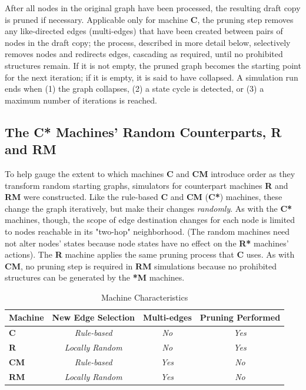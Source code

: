\documentclass{tufte-handout}
\begin{document}
\vspace{1mm}
After all nodes in the original graph have been processed,
the resulting draft copy is pruned if necessary.
Applicable only for machine \textbf{C}, the pruning step removes
any like-directed edges (multi-edges) that have been created between pairs
of nodes in the draft copy; the process, described in more detail below,
selectively removes nodes and redirects edges, cascading as required,
until no prohibited structures remain.
If it is not empty, the pruned graph becomes the starting point for the next iteration;
if it is empty, it is said to have collapsed.
A simulation run ends when (1) the graph collapses, (2) a state cycle is detected,
or (3) a maximum number of iterations is reached.

\subsection{The \textbf{C*} Machines' Random Counterparts, \textbf{R} and \textbf{RM}}

To help gauge the extent to which machines \textbf{C} and \textbf{CM}
introduce order as they transform random starting graphs, simulators for counterpart
machines \textbf{R} and \textbf{RM} were constructed. Like the rule-based \textbf{C} and
\textbf{CM} (\textbf{C*}) machines, these change the graph iteratively, but make their
changes \textit{randomly}.
As with the \textbf{C*} machines, though, the scope of edge destination changes for each node is
limited to nodes reachable in its "two-hop" neighborhood. (The random machines need not alter nodes' states
because node states have no effect on the \textbf{R*} machines' actions).
The \textbf{R} machine applies the same pruning process that \textbf{C} uses. As
with \textbf{CM}, no pruning step is required in \textbf{RM} simulations because
no prohibited structures can be generated by the \textbf{*M} machines.

\begin{table}
\caption{Machine Characteristics}
\centering
\begin{tabular}{lccc}
\toprule
Machine & New Edge Selection & Multi-edges & Pruning Performed \\
\midrule
\textbf{C} & \textit{Rule-based} & \textit{No} & \textit{Yes} \\
\textbf{R} & \textit{Locally Random} & \textit{No} & \textit{Yes} \\
\cmidrule(r){2-4}
\textbf{CM} & \textit{Rule-based} & \textit{Yes} & \textit{No} \\
\textbf{RM} & \textit{Locally Random} & \textit{Yes} & \textit{No} \\
\bottomrule
\end{tabular}
\label{tab:Tab1}
\end{table}
\vspace{3mm}
\end{document}
